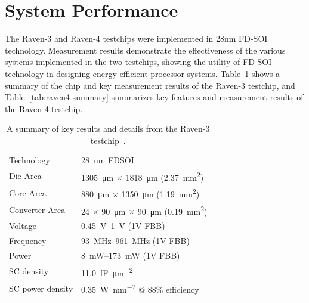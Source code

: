\documentclass[graybox]{svmult}
\begin{document}
\section{System Performance}

The Raven-3 and Raven-4 testchips were implemented in 28nm FD-SOI technology.
Measurement results demonstrate the effectiveness of the various systems implemented in the two testchips, showing the utility of FD-SOI technology in designing energy-efficient processor systems.
Table~\ref{tab:raven3-summary} shows a summary of the chip and key measurement results of the Raven-3 testchip, and Table~\ref{tab:raven4-summary} summarizes key features and measurement results of the Raven-4 testchip.

\begin{table}[]
\footnotesize
\renewcommand{\arraystretch}{1.2}
\centering
\begin{tabular}{@{}ll@{}}
\toprule
Technology & \SI{28}{\nano\meter} FDSOI\\ 
Die Area & \SI{1305}{\micro\meter} $\times$ \SI{1818}{\micro\meter} (\SI{2.37}{\milli\meter\squared})\\ 
Core Area & \SI{880}{\micro\meter} $\times$ \SI{1350}{\micro\meter} (\SI{1.19}{\milli\meter\squared})\\ 
Converter Area & 24 $\times$ \SI{90}{\micro\meter} $\times$ \SI{90}{\micro\meter} (\SI{0.19}{\milli\meter\squared})\\ 
Voltage & \SIrange{0.45}{1}{\volt} (1V FBB)\\ 
Frequency & \SIrange{93}{961}{\mega\hertz} (1V FBB) \\ 
Power & \SIrange{8}{173}{\milli\watt} (1V FBB)\\ 
SC density & \SI[per-mode=symbol]{11.0}{\femto\farad\per\micro\meter\squared}\\ 
SC power density &\SI[per-mode=symbol]{0.35}{\watt\per\milli\meter\squared} @ 88\% efficiency \\
\bottomrule
\end{tabular}
\caption{A summary of key results and details from the Raven-3 testchip~\cite{Zimmer2016}.}
\label{tab:raven3-summary}
\end{table}
\end{document}
